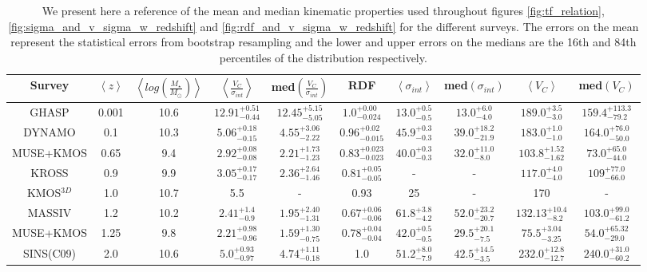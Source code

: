 \documentclass[fleqn,usenatbib]{mn2e}
\begin{document}
\begin{table*}
\centering
\begin{threeparttable}
\caption{We present here a reference of the mean and median kinematic properties used throughout figures \protect\ref{fig:tf_relation}, \protect\ref{fig:sigma_and_v_sigma_w_redshift} and \protect\ref{fig:rdf_and_v_sigma_w_redshift} for the different surveys.
The errors on the mean represent the statistical errors from bootstrap resampling and the lower and upper errors on the medians are the 16th and 84th percentiles of the distribution respectively.}
\label{tab:evolution_numbers}
\begin{tabular}{c c c c c c c c c c }

 \hline
Survey & $\left< z \right> $ & $\left< log\left(\frac{M_{\star}}{M_{\odot}}\right)\right>$ & $\left< \frac{V_{C}}{\sigma_{int}} \right>$ & med$\left(\frac{V_{C}}{\sigma_{int}}\right)$ & RDF & $ \left< \sigma_{int} \right>$ & med$\left(\sigma_{int}\right)$ & $\left<V_{C}\right>$ & med$\left(V_{C}\right)$  \\
 \hline
 GHASP & 0.001 & 10.6 & $12.91^{+0.51}_{-0.44}$ & $12.45^{+5.15}_{-5.05}$ & $1.0^{+0.00}_{-0.024}$ & $13.0^{+0.5}_{-0.5}$ & $13.0^{+6.0}_{-4.0}$ & $189.0^{+3.5}_{-3.0}$ & $159.4^{+113.3}_{-79.2}$ \\
 DYNAMO & 0.1 & 10.3 & $5.06^{+0.18}_{-0.15}$ & $4.55^{+3.06}_{-2.22}$ & $0.96^{+0.02}_{-0.015}$ & $45.9^{+0.3}_{-0.3}$ & $39.0^{+18.2}_{-21.9}$ & $183.0^{+1.0}_{-1.0}$ & $164.0^{+76.0}_{-50.0}$ \\
 MUSE+KMOS & 0.65 & 9.4 & $2.92^{+0.08}_{-0.08}$ & $2.21^{+1.73}_{-1.23}$ & $0.83^{+0.023}_{-0.023}$ & $40.0^{+0.3}_{-0.3}$ & $32.0^{+11.0}_{-8.0}$ & $103.8^{+1.52}_{-1.62}$ & $73.0^{+65.0}_{-44.0}$ \\
 KROSS & 0.9 & 9.9 & $3.05^{+0.17}_{-0.17}$ & $2.36^{+2.64}_{-1.46}$ & $0.81^{+0.05}_{-0.05}$ & - & - & $117.0^{+4.0}_{-4.0}$ & $109^{+77.0}_{-66.0}$ \\
 KMOS$^{3D}$ & 1.0 & 10.7 & 5.5 & - & 0.93 & 25 & - & 170 & - \\
 MASSIV & 1.2 & 10.2 & $2.41^{+1.4}_{-0.9}$ & $1.95^{+2.40}_{-1.31}$ & $0.67^{+0.06}_{-0.06}$ & $61.8^{+3.8}_{-4.2}$ & $52.0^{+23.2}_{-20.7}$ & $132.13^{+10.4}_{-8.2}$ & $103.0^{+99.0}_{-61.2}$ \\
 MUSE+KMOS & 1.25 & 9.8 & $2.21^{+0.98}_{-0.96}$ & $1.59^{+1.30}_{-0.75}$ & $0.78^{+0.04}_{-0.04}$ & $42.0^{+0.5}_{-0.5}$ & $29.5^{+20.1}_{-7.5}$ & $75.5^{+3.04}_{-3.25}$ & $54.0^{+65.32}_{-29.0}$ \\
 SINS(C09) & 2.0 & 10.6 & $5.0^{+0.93}_{-0.97}$ & $4.74^{+1.11}_{-0.18}$ & 1.0 & $51.2^{+8.0}_{-7.9}$ & $42.5^{+14.5}_{-3.5}$ & $232.0^{+12.8}_{-12.7}$ & $240.0^{+31.0}_{-60.2}$ \\

\end{tabular}
\end{threeparttable}
\end{table*}
\end{document}
